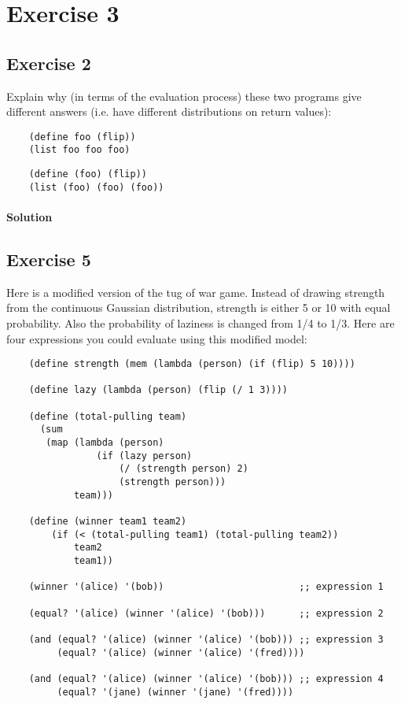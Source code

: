 \section*{Exercise 3}

\subsection*{Exercise 2}
Explain why (in terms of the evaluation process) these two programs give different answers 
(i.e. have different distributions on return values):
\begin{lstlisting}
    (define foo (flip))
    (list foo foo foo)
\end{lstlisting}

\begin{lstlisting}
    (define (foo) (flip))
    (list (foo) (foo) (foo))
\end{lstlisting}    

\paragraph{Solution}


\subsection*{Exercise 5}
Here is a modified version of the tug of war game. Instead of drawing strength from the continuous Gaussian 
distribution, strength is either 5 or 10 with equal probability. Also the probability of laziness is changed from 1/4 to 1/3. 
Here are four expressions you could evaluate using this modified model:

\begin{lstlisting}
    (define strength (mem (lambda (person) (if (flip) 5 10))))

    (define lazy (lambda (person) (flip (/ 1 3))))

    (define (total-pulling team)
      (sum 
       (map (lambda (person) 
                (if (lazy person) 
                    (/ (strength person) 2) 
                    (strength person)))
            team)))

    (define (winner team1 team2) 
        (if (< (total-pulling team1) (total-pulling team2)) 
            team2 
            team1))

    (winner '(alice) '(bob))                        ;; expression 1

    (equal? '(alice) (winner '(alice) '(bob)))      ;; expression 2

    (and (equal? '(alice) (winner '(alice) '(bob))) ;; expression 3
         (equal? '(alice) (winner '(alice) '(fred))))

    (and (equal? '(alice) (winner '(alice) '(bob))) ;; expression 4
         (equal? '(jane) (winner '(jane) '(fred))))
\end{lstlisting}

